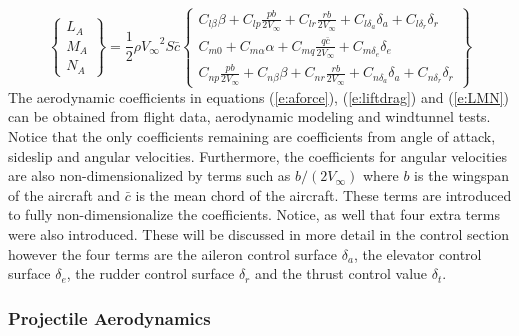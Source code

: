 \begin{equation}\label{e:LMN}
\begin{Bmatrix} L_A \\ M_A \\ N_A \end{Bmatrix} = \frac{1}2\rho
{V_{\infty}}^2 S \bar{c} \begin{Bmatrix} C_{l\beta}\beta + C_{lp}\frac{pb}{2V_{\infty}} + C_{lr}\frac{rb}{2V_{\infty}} + C_{l\delta_a}{\delta_a} + C_{l\delta_r}{\delta_r}
\\  C_{m0} + C_{m\alpha}\alpha + C_{mq}\frac{q\bar{c}}{2V_{\infty}}+ C_{m\delta_e}\delta_e  \\ C_{np}\frac{pb}{2V_{\infty}} + C_{n\beta}\beta + C_{nr}\frac{rb}{2V_{\infty}} + C_{n\delta_a}\delta_a + C_{n\delta_r}\delta_r \end{Bmatrix}
\end{equation}
The aerodynamic coefficients in equations
(\ref{e:aforce}), (\ref{e:liftdrag}) and (\ref{e:LMN}) can be obtained from
flight data, aerodynamic modeling and windtunnel tests. Notice that
the only coefficients remaining are coefficients from angle of attack,
sideslip and angular velocities. Furthermore, the coefficients for
angular velocities are also non-dimensionalized by terms such as
$b/(2V_{\infty})$ where $b$ is the wingspan of the aircraft and
$\bar{c}$ is the mean chord of the aircraft. These terms are
introduced to fully non-dimensionalize the coefficients. Notice, as
well that four extra terms were also introduced. These will 
be discussed in more detail in the control section however the four
terms are the aileron control surface $\delta_a$, the elevator
control surface $\delta_e$, the rudder control surface $\delta_r$ and
the thrust control value $\delta_t$. 

\subsubsection{Projectile Aerodynamics}

